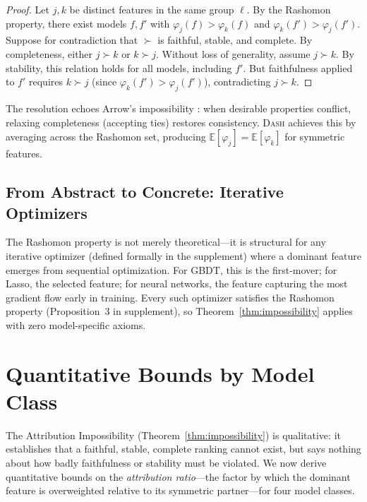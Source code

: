 \documentclass{article}
\newcommand{\E}{\mathbb{E}}
\newcommand{\DASH}{\textsc{Dash}}
\newcommand{\GBDT}{\textsc{GBDT}}
\begin{document}
\begin{proof}
Let $j, k$ be distinct features in the same group $\ell$.
By the Rashomon property, there exist models $f, f'$ with $\varphi_j(f) > \varphi_k(f)$ and $\varphi_k(f') > \varphi_j(f')$.
Suppose for contradiction that $\succ$ is faithful, stable, and complete.
By completeness, either $j \succ k$ or $k \succ j$.
Without loss of generality, assume $j \succ k$.
By stability, this relation holds for all models, including $f'$.
But faithfulness applied to $f'$ requires $k \succ j$ (since $\varphi_k(f') > \varphi_j(f')$), contradicting $j \succ k$.
\end{proof}

The resolution echoes Arrow's impossibility \citep{arrow1951social}: when desirable properties conflict, relaxing completeness (accepting ties) restores consistency.
\DASH{} achieves this by averaging across the Rashomon set, producing $\E[\varphi_j] = \E[\varphi_k]$ for symmetric features.

\subsection{From Abstract to Concrete: Iterative Optimizers}
\label{sec:iterative}

The Rashomon property is not merely theoretical---it is structural for any iterative optimizer (defined formally in the supplement) where a dominant feature emerges from sequential optimization.
For \GBDT{}, this is the first-mover; for Lasso, the selected feature; for neural networks, the feature capturing the most gradient flow early in training.
Every such optimizer satisfies the Rashomon property (Proposition~3 in supplement), so Theorem~\ref{thm:impossibility} applies with zero model-specific axioms.

\section{Quantitative Bounds by Model Class}
\label{sec:bounds}

The Attribution Impossibility (Theorem~\ref{thm:impossibility}) is qualitative: it establishes that a faithful, stable, complete ranking cannot exist, but says nothing about how badly faithfulness or stability must be violated.
We now derive quantitative bounds on the \emph{attribution ratio}---the factor by which the dominant feature is overweighted relative to its symmetric partner---for four model classes.
\end{document}

